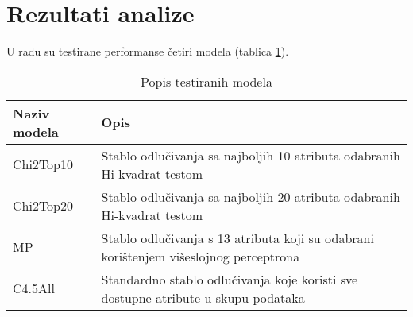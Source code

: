 \section{Rezultati analize}
\label{ch:ch5}

U radu su testirane performanse četiri modela (tablica \ref{tab:models}).

\begin{table}[!ht]
    \centering
    \caption[Popis testiranih modela]{Popis testiranih modela}
    \label{tab:models}
    \begin{tabular}{|| p{2cm} | p{13cm} ||}
            \hline
            Naziv modela & Opis \\ [0.5ex]
            \hline
            \hline
            Chi2Top10 & Stablo odlučivanja sa najboljih 10 atributa odabranih Hi-kvadrat testom \\
            \hline
            Chi2Top20 & Stablo odlučivanja sa najboljih 20 atributa odabranih Hi-kvadrat testom \\
            \hline
            MP & Stablo odlučivanja s 13 atributa koji su odabrani korištenjem višeslojnog perceptrona \\
            \hline
            C4.5All & Standardno stablo odlučivanja koje koristi sve dostupne atribute u skupu podataka \\ [1ex]
            \hline
    \end{tabular}
\end{table}


